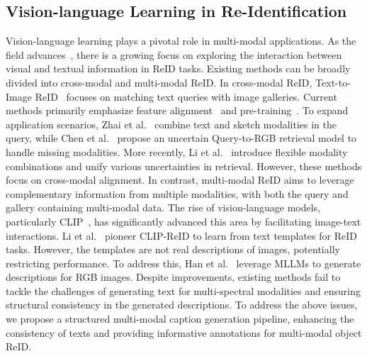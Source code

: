 \subsection{Vision-language Learning in Re-Identification}
Vision-language learning plays a pivotal role in multi-modal applications.
%
As the field advances~\cite{yu2024boosting,diao2024unveiling,yu2024llms}, there is a growing focus on exploring the interaction between visual and textual information in ReID tasks.
%
Existing methods can be broadly divided into cross-modal and multi-modal ReID. 
%
In cross-modal ReID, Text-to-Image ReID~\cite{ding2021semantically} focuses on matching text queries with image galleries. 
%
Current methods primarily emphasize feature alignment~\cite{jiang2023cross} and pre-training~\cite{tan2024harnessing}. 
%
To expand application scenarios, Zhai et al.~\cite{zhai2022trireid} combine text and sketch modalities in the query, while Chen et al.~\cite{chen2023towards} propose an uncertain Query-to-RGB retrieval model to handle missing modalities. 
%
More recently, Li et al.~\cite{li2024all} introduce flexible modality combinations and unify various uncertainties in retrieval.
%
However, these methods focus on cross-modal alignment.
%
In contrast, multi-modal ReID aims to leverage complementary information from multiple modalities, with both the query and gallery containing multi-modal data. 
%
The rise of vision-language models, particularly CLIP~\cite{radford2021learning}, has significantly advanced this area by facilitating image-text interactions. 
%
Li et al.~\cite{li2023clipreid} pioneer CLIP-ReID to learn from text templates for ReID tasks. 
%
However, the templates are not real descriptions of images, potentially restricting performance. 
%
To address this, Han et al.~\cite{han2024clip} leverage MLLMs to generate descriptions for RGB images.
%
Despite improvements, existing methods fail to tackle the challenges of generating text for multi-spectral modalities and ensuring structural consistency in the generated descriptions. 
% 
To address the above issues, we propose a structured multi-modal caption generation pipeline, enhancing the consistency of texts and providing informative annotations for multi-modal object ReID.
%
